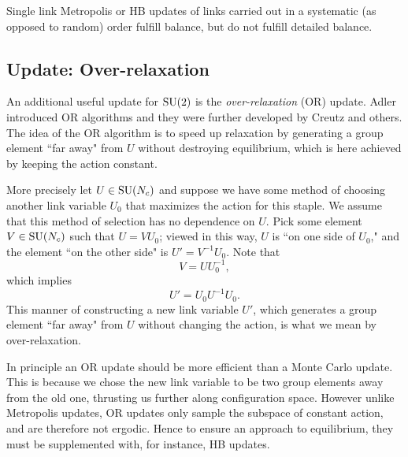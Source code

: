 Single link Metropolis or HB updates of links carried out in a systematic 
(as opposed to random) order fulfill balance, but do not
fulfill detailed balance.

\subsection{Update: Over-relaxation}

An additional useful update for $\operatorname{SU}(2)$ is the 
{\it over-relaxation} (OR) update. 
Adler introduced OR algorithms \cite{adler_over-relaxation_1981} and 
they were further developed by Creutz \cite{creutz_overrelaxation_1987} 
and others. The idea of the OR algorithm is to speed up relaxation 
by generating a group element ``far away" from $U$ without
destroying equilibrium, which is here achieved by keeping the action constant.

More precisely let $U\in\operatorname{SU}(N_c)$ and suppose we have some method of
choosing another link variable $U_0$ that maximizes
the action for this staple.  We assume that this method of selection has no
dependence on $U$.  Pick some element $V\in\operatorname{SU}(N_c)$ such that $U=VU_0$; viewed
in this way, $U$ is ``on one side of $U_0$," and the element 
``on the other side" is $U'=V^{-1}U_0$.  Note that
\begin{equation}
  V=U U_0^{-1},
\end{equation}
which implies
\begin{equation}
  U' = U_0 U^{-1} U_0.
\end{equation}
This manner of constructing a new link variable $U'$, which generates
a group element ``far away" from $U$ without changing the action, 
is what we mean by over-relaxation.

In principle an OR update should be more efficient than a Monte
Carlo update. This is because we chose the new link variable to be two
group elements away from the old one, thrusting us further
along configuration space. However unlike Metropolis updates, OR updates 
only sample the subspace of constant action, and are therefore not ergodic. 
Hence to ensure an approach to equilibrium, they must be supplemented with, 
for instance, HB updates.

